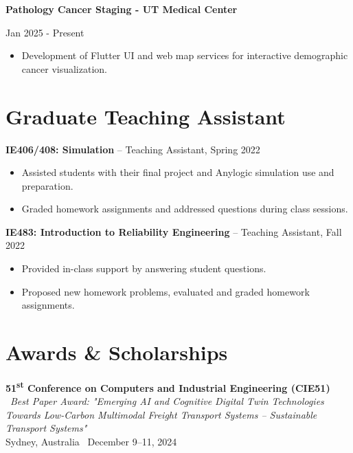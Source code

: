 \documentclass[10pt, letterpaper]{article}
\newenvironment{highlights}{
    \begin{itemize}[
        topsep=0.10 cm,
        parsep=0.10 cm,
        partopsep=0pt,
        itemsep=0pt,
        leftmargin=0 cm + 10pt
    ]
}{
    \end{itemize}
} %
\newenvironment{twocolentry}[2][]{
    \onecolentry
    \def\secondColumn{#2}
    \setcolumnwidth{\fill, 4.5 cm}
    \begin{paracol}{2}
}{
    \switchcolumn \raggedleft \secondColumn
    \end{paracol}
    \endonecolentry
} %
\begin{document}
    \vspace{0.3cm} 
    \begin{twocolentry}{Jan 2025 - Present} 
        \textbf{Pathology Cancer Staging - UT Medical Center} 
    \end{twocolentry} 
    \begin{highlights} 
        \item Development of Flutter UI and web map services for interactive demographic cancer visualization. 
    \end{highlights} 
    \vspace{0.3cm} 
    \noindent
    







\section*{Graduate Teaching Assistant}

\textbf{IE406/408: Simulation} – Teaching Assistant, Spring 2022  
\begin{itemize}
    \item Assisted students with their final project and Anylogic simulation use and preparation.
    \item Graded homework assignments and addressed questions during class sessions.
\end{itemize}

\textbf{IE483: Introduction to Reliability Engineering} – Teaching Assistant, Fall 2022  
\begin{itemize}
    \item Provided in-class support by answering student questions.
    \item Proposed new homework problems, evaluated and graded homework assignments.
\end{itemize}


    \section*{Awards \& Scholarships}
    \small

    \noindent \textbf{51\textsuperscript{st} Conference on Computers and Industrial Engineering (CIE51)} \ \textit{Best Paper Award: "Emerging AI and Cognitive Digital Twin Technologies Towards Low-Carbon Multimodal Freight Transport Systems – Sustainable Transport Systems"} \\ Sydney, Australia \  December 9–11, 2024 \
    \vspace{0.5em}
\end{document}
